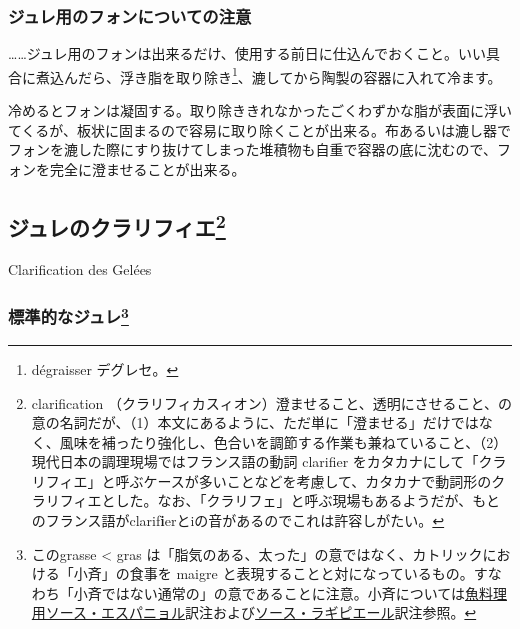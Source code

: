 \begin{recette}
{\subsubsection{ジュレ用のフォンについての注意}\label{observation-sur-l-emplois-des-fonds-destines-aux-gelees}}

\ldots{}\ldots{}ジュレ用のフォンは出来るだけ、使用する前日に仕込んでおくこと。いい具合に煮込んだら、浮き脂を取り除き\footnote{dégraisser
  デグレセ。}、漉してから陶製の容器に入れて冷ます。

冷めるとフォンは凝固する。取り除ききれなかったごくわずかな脂が表面に浮いてくるが、板状に固まるので容易に取り除くことが出来る。布あるいは漉し器でフォンを漉した際にすり抜けてしまった堆積物も自重で容器の底に沈むので、フォンを完全に澄ませることが出来る。

\newpage

\hypertarget{clarfication-des-gelees}{%
\subsection[ジュレのクラリフィエ]{\texorpdfstring{ジュレのクラリフィエ\footnote{clarification
  （クラリフィカスィオン）澄ませること、透明にさせること、の意の名詞だが、（1）本文にあるように、ただ単に「澄ませる」だけではなく、風味を補ったり強化し、色合いを調節する作業も兼ねていること、（2）現代日本の調理現場ではフランス語の動詞
  clarifier
  をカタカナにして「クラリフィエ」と呼ぶケースが多いことなどを考慮して、カタカナで動詞形のクラリフィエとした。なお、「クラリフェ」と呼ぶ現場もあるようだが、もとのフランス語がclarif\textbf{i}erとiの音があるのでこれは許容しがたい。}}{ジュレのクラリフィエ}}\label{clarfication-des-gelees}}

\begin{frsecbenv}

Clarification des Gelées

\end{frsecbenv}


\hypertarget{gelees-ordinaires}{%
\subsubsection[標準的なジュレ]{\texorpdfstring{標準的なジュレ\footnote{このgrasse
  \textless{} gras
  は「脂気のある、太った」の意ではなく、カトリックにおける「小斉」の食事を
  maigre
  と表現することと対になっているもの。すなわち「小斉ではない通常の」の意であることに注意。小斉については\protect\hyperlink{sauce-espagnole-maigre}{魚料理用ソース・エスパニョル}訳注および\protect\hyperlink{sauce-laguipiere}{ソース・ラギピエール}訳注参照。}}{標準的なジュレ}}\label{gelees-ordinaires}}


\end{recette}

